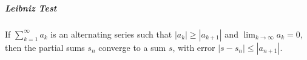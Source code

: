\documentclass[11pt]{article}
\begin{document}
	\subparagraph{Leibniz Test} If $\sum_{k=1}^\infty a_k$ is an alternating series such that $|a_k| \geq |a_{k+1}|$ and $\lim_{k\rightarrow \infty} a_k = 0$, then the partial sums $s_n$ converge to a sum $s$, with error $|s - s_n| \leq |a_{n+1}|$.

%		
%		


\end{document}
